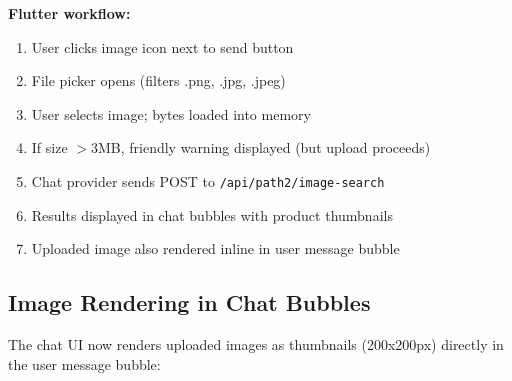 \documentclass[12pt, twoside]{report}
\begin{document}
\textbf{Flutter workflow:}
\begin{enumerate}
    \item User clicks image icon next to send button
    \item File picker opens (filters .png, .jpg, .jpeg)
    \item User selects image; bytes loaded into memory
    \item If size $>$3MB, friendly warning displayed (but upload proceeds)
    \item Chat provider sends POST to \texttt{/api/path2/image-search}
    \item Results displayed in chat bubbles with product thumbnails
    \item Uploaded image also rendered inline in user message bubble
\end{enumerate}

\subsection{Image Rendering in Chat Bubbles}

The chat UI now renders uploaded images as thumbnails (200x200px) directly in the user message bubble:
\end{document}
